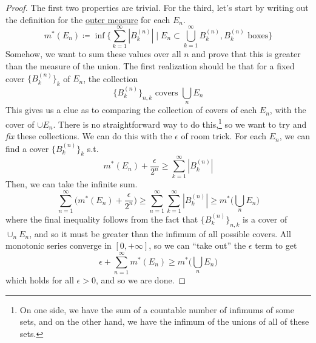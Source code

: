   \begin{proof}
    The first two properties are trivial. For the third, let's start by writing out the definition for the \hyperref[def:outer-measure]{outer measure} for each $E_n$. 
    \begin{equation}
      m^\ast (E_n) \coloneqq \inf \bigg\{ \sum_{k=1}^\infty |B_k^{(n)}| \;\bigg|\; E_n \subset \bigcup_{k=1}^\infty B_k^{(n)}, B_k^{(n)} \text{ boxes} \bigg\}
    \end{equation}
    Somehow, we want to sum these values over all $n$ and prove that this is greater than the measure of the union. The first realization should be that for a fixed cover $\{B_k^{(n)}\}_k$ of $E_n$, the collection 
    \begin{equation}
      \{B_k^{(n)}\}_{n, k} \text{ covers } \bigcup_{n} E_n
    \end{equation} 
    This gives us a clue as to comparing the collection of covers of each $E_n$, with the cover of $\cup E_n$. There is no straightforward way to do this,\footnote{On one side, we have the sum of a countable number of infimums of some sets, and on the other hand, we have the infimum of the unions of all of these sets.} so we want to try and \textit{fix} these collections. We can do this with the $\epsilon$ of room trick. For each $E_n$, we can find a cover $\{B_k^{(n)}\}_k$ s.t. 
    \begin{equation}
      m^\ast (E_n) + \frac{\epsilon}{2^n} \geq \sum_{k=1}^\infty |B_k^{(n)}| 
    \end{equation}
    Then, we can take the infinite sum. 
    \begin{equation}
      \sum_{n=1}^\infty \bigg( m^\ast (E_n) + \frac{\epsilon}{2^n} \bigg) \geq \sum_{n=1}^\infty \sum_{k=1}^\infty |B_k^{(n)}| \geq m^\ast \bigg( \bigcup_n E_n \bigg)
    \end{equation} 
    where the final inequality follows from the fact that $\{B_k^{(n)}\}_{n, k}$ is a cover of $\cup_n E_n$, and so it must be greater than the infimum of all possible covers. All monotonic series converge in $[0, +\infty]$, so we can ``take out'' the $\epsilon$ term to get 
    \begin{equation}
      \epsilon + \sum_{n=1}^\infty m^\ast (E_n) \geq m^\ast \bigg( \bigcup_n E_n \bigg)
    \end{equation}
    which holds for all $\epsilon > 0$, and so we are done. 
  \end{proof}

